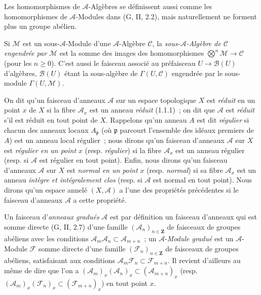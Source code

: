 \begin{env}[4.1.3]
Les homomorphismes de $\mathcal{A}$-Algèbres se définissent aussi comme les
homomorphismes de $\mathcal{A}$-Modules dans (G, II, 2.2), mais naturellement
ne forment plus un groupe abélien.

Si $\mathcal{M}$ est un sous-$\mathcal{A}$-Module d'une
$\mathcal{A}$-Algèbre $\mathcal{C}$, la \emph{sous-$\mathcal{A}$-Algèbre de
$\mathcal{C}$ engendrée par $\mathcal{M}$} est la somme des images des
homomorphismes $\bigotimes^n\mathcal{M}\to\mathcal{C}$ (pour les
$n\geqslant 0$). C'est aussi le faisceau associé au préfaisceau
$U\to\mathcal{B}(U)$ d'algèbres, $\mathcal{B}(U)$ étant la sous-algèbre
de $\Gamma(U,\mathcal{C})$ engendrée par le sous-module
$\Gamma(U,\mathcal{M})$.
\end{env}

\begin{env}[4.1.4]
\label{0.4.1.4-fr}
On dit qu'un faisceau d'anneaux $\mathcal{A}$ sur un espace topologique $X$
est \emph{réduit} en un point $x$ de $X$ si la fibre $\mathcal{A}_x$ est un
anneau \emph{réduit} (1.1.1)~; on dit que $\mathcal{A}$ est \emph{réduit}
s'il est réduit en tout point de $X$. Rappelons qu'un anneau $A$ est dit
\emph{régulier} si chacun des anneaux locaux $A_{\mathfrak p}$ (où
$\mathfrak p$ parcourt l'ensemble des idéaux premiers de $A$) est un anneau
local régulier~; nous dirons qu'un faisceau d'anneaux $\mathcal{A}$ sur $X$
est \emph{régulier en un point} $x$ (resp. \emph{régulier}) si la fibre
$\mathcal{A}_x$ est un anneau régulier (resp. si $\mathcal{A}$ est régulier
en tout point). Enfin, nous dirons qu'un faisceau d'anneaux $\mathcal{A}$ sur
$X$ est \emph{normal en un point} $x$ (resp. \emph{normal}) si sa fibre
$\mathcal{A}_x$ est un anneau \emph{intègre et intégralement clos} (resp. si
$\mathcal{A}$ est normal en tout point). Nous dirons qu'un espace annelé
$(X,\mathcal{A})$ a l'une des propriétés précédentes si le faisceau d'anneaux
$\mathcal{A}$ a cette propriété.

Un faisceau d'\emph{anneaux gradués} $\mathcal{A}$ est par définition un
faisceau d'anneaux qui est somme directe (G, II, 2.7) d'une famille
$(\mathcal{A}_n)_{n\in\mathbf Z}$ de faisceaux de groupes abéliens avec les
conditions $\mathcal{A}_m\mathcal{A}_n\subset\mathcal{A}_{m+n}$~; un
$\mathcal{A}$-\emph{Module gradué} est un $\mathcal{A}$-Module
$\mathcal{F}$ somme directe d'une famille
$(\mathcal{F}_n)_{n\in\mathbf Z}$ de faisceaux de groupes abéliens,
satisfaisant aux conditions
$\mathcal{A}_m\mathcal{F}_n\subset\mathcal{F}_{m+n}$. Il revient d'ailleurs
au même de dire que l'on a
$(\mathcal{A}_m)_x(\mathcal{A}_n)_x\subset(\mathcal{A}_{m+n})_x$
(resp.
$(\mathcal{A}_m)_x(\mathcal{F}_n)_x\subset(\mathcal{F}_{m+n})_x$)
en tout point $x$.
\end{env}

